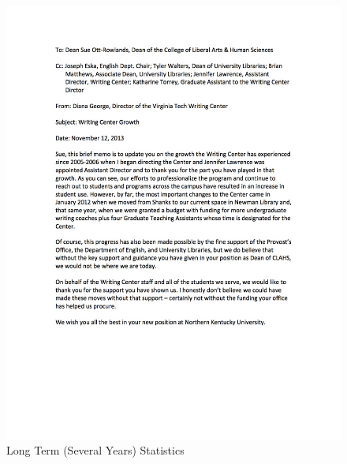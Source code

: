 \documentclass[12pt]{article} %
\begin{document}
  \begin{figure}[H]
  \centering
  \includegraphics[width=0.5\linewidth]{artifacts/long_term}
  \caption{Long Term (Several Years) Statistics}
  \label{fig:StatisticsLongTerm}
  \end{figure}
\end{document}
